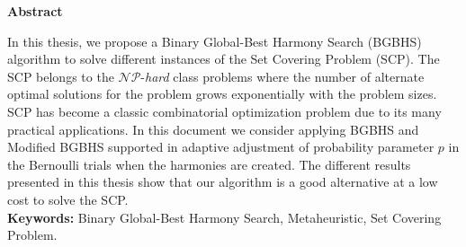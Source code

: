 \noindent
\Large{\textbf{Abstract}}\\

\normalsize

In this thesis, we propose a Binary Global-Best Harmony Search (BGBHS)  algorithm to solve different instances of the Set Covering Problem (SCP). The SCP belongs to the $\mathcal{N} \mathcal{P}$-\textit{hard} class problems where the number of alternate optimal solutions for the problem grows exponentially with the problem sizes. SCP has become a classic combinatorial optimization problem due to its many practical applications. In this document we consider applying  BGBHS and Modified BGBHS supported in adaptive adjustment of probability parameter $p$ in the Bernoulli trials when the harmonies are created. The different results presented in this thesis show that our algorithm is a good alternative at a low cost to solve the SCP.\\


\textbf{Keywords:} Binary Global-Best Harmony Search, Metaheuristic, Set Covering Problem.